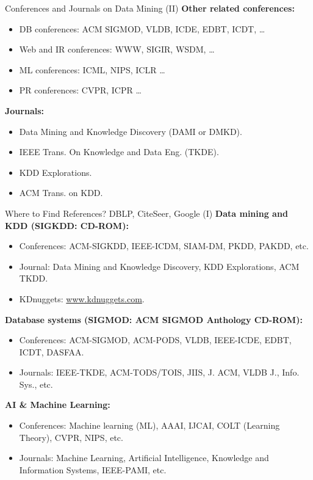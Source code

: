 \begin{frame}{Conferences and Journals on Data Mining (II)}
	\textbf{Other related conferences:}
	\begin{itemize}
		\item DB conferences: ACM SIGMOD, VLDB, ICDE, EDBT, ICDT, \ldots
		\item Web and IR conferences: WWW, SIGIR, WSDM, \ldots
		\item ML conferences: ICML, NIPS, ICLR \ldots
		\item PR conferences: CVPR, ICPR \ldots
	\end{itemize}
	\textbf{Journals:}
	\begin{itemize}
		\item Data Mining and Knowledge Discovery (DAMI or DMKD).
		\item IEEE Trans. On Knowledge and Data Eng. (TKDE).
		\item KDD Explorations.
		\item ACM Trans. on KDD.
	\end{itemize}
\end{frame}

\begin{frame}{Where to Find References? DBLP, CiteSeer, Google (I)}
	\textbf{Data mining and KDD (SIGKDD: CD-ROM):}
	\begin{itemize}
		\item Conferences: ACM-SIGKDD, IEEE-ICDM, SIAM-DM, PKDD, PAKDD, etc.
		\item Journal: Data Mining and Knowledge Discovery, KDD Explorations, 
		ACM TKDD.
		\item KDnuggets: \url{www.kdnuggets.com}.
	\end{itemize}
	\textbf{Database systems (SIGMOD: ACM SIGMOD Anthology CD-ROM):}
	\begin{itemize}
		\item Conferences: ACM-SIGMOD, ACM-PODS, VLDB, IEEE-ICDE, EDBT, ICDT, 
		DASFAA.
		\item Journals: IEEE-TKDE, ACM-TODS/TOIS, JIIS, J. ACM, VLDB J., Info. 
		Sys., etc.
	\end{itemize}
	\textbf{AI \& Machine Learning:}
	\begin{itemize}
		\item Conferences: Machine learning (ML), AAAI, IJCAI, COLT (Learning 
		Theory), CVPR, NIPS, etc.
		\item Journals: Machine Learning, Artificial Intelligence, Knowledge 
		and Information Systems, IEEE-PAMI, etc.
	\end{itemize}
\end{frame}

